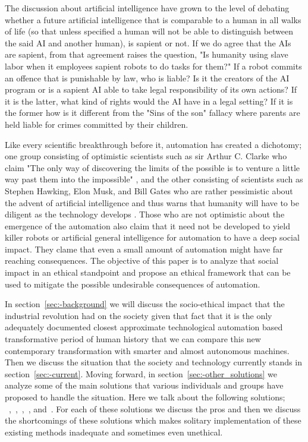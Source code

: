 The discussion about artificial intelligence have grown to the level of debating whether a future artificial intelligence that is comparable to a human in all walks of life (so that unless specified a human will not be able to distinguish between the said AI and another human\cite{eyal1999turing}), is sapient or not. If we do agree that the AIs are sapient, from that agreement raises the question, "Is humanity using slave labor when it employees sapient robots to do tasks for them?" If a robot commits an offence that is punishable by law, who is liable? Is it the creators of the AI program or is a sapient AI able to take legal responsibility of its own actions? If it is the latter, what kind of rights would the AI have in a legal setting? If it is the former how is it different from the "Sins of the son" fallacy where parents are held liable for crimes committed by their children.  

Like every scientific breakthrough before it, automation has created a dichotomy; one group consisting of optimistic scientists such as sir Arthur C. Clarke who claim "The only way of discovering the limits of the possible is to venture a little way past them into the impossible" \cite{arthur1962limits}, and the other consisting of scientists such as Stephen Hawking, Elon Musk, and Bill Gates who are rather pessimistic about the advent of artificial intelligence and thus warns that humanity will have to be diligent as the technology develops \cite{michael2016warning}. Those who are not optimistic about the emergence of the automation also claim that it need not be developed to yield killer robots or artificial general intelligence \cite{luke2013agi} for automation to have a deep social impact. They clame that even a small amount of automation might have far reaching consequences.  The objective of this paper is to analyze that social impact in an ethical standpoint and propose an ethical framework that can be used to mitigate the possible undesirable consequences of automation.  

In section~\ref{sec:-background} we will discuss the socio-ethical impact that the industrial revolution had on the society given that fact that it is the only adequately documented closest approximate technological automation based transformative period of human history that we can compare this new contemporary transformation with smarter and almost autonomous machines. Then we discuss the situation that the society and technology currently stands in section~\ref{sec:-current}. Moving forward, in section~\ref{sec:-other_solutions}  we analyze some of the main solutions that various individuals and groups have proposed to handle the situation. Here we talk about the following solutions; ~,~,~,~, and~. For each of these solutions we discuss the pros and then we discuss the shortcomings of these solutions which makes solitary implementation of these existing methods inadequate and sometimes even unethical.

